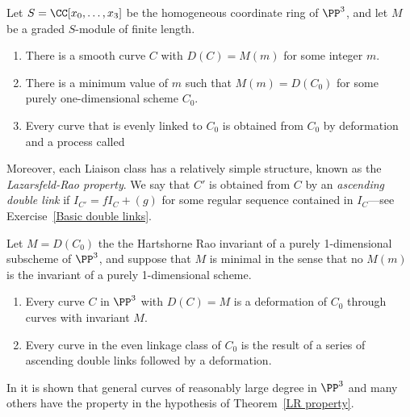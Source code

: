 \begin{fact}
\begin{theorem}
Let $S = \CC[x_0, \dots, x_3]$ be the homogeneous coordinate ring of $\PP^3$, and let $M$ be a graded $S$-module of finite length.
\begin{enumerate}
\item There is a smooth curve $C$ with $D(C) = M(m)$ for some integer $m$.
\item There is a minimum value of $m$ such that $M(m) = D(C_0)$ for some purely one-dimensional scheme $C_0$.
\item Every curve that is evenly linked to $C_0$ is obtained from $C_0$ by deformation and a process called
\end{enumerate}
\end{theorem}

Moreover, each Liaison class has a relatively simple structure, known as the \emph{Lazarsfeld-Rao property}.
We say that $C'$ is obtained from $C$ by an \emph{ascending double link} if $I_{C'} = fI_C+(g)$ for some regular sequence
contained in $I_C$---see Exercise~\ref{Basic double links}. 

\begin{theorem}\cite{MR1087803}\label{LR property}
Let $M = D(C_0)$ the the Hartshorne Rao invariant of a purely 1-dimensional subscheme of $\PP^3$, and suppose that
$M$ is minimal in the sense that no $M(m)$ is the invariant of a purely 1-dimensional scheme. 
\begin{enumerate}
 \item Every curve $C$ in $\PP^3$ with $D(C) = M$ is a deformation of $C_0$ through curves with invariant $M$.
 \item Every curve in the even linkage class of $C_0$ is the result of a series of ascending double links followed by a deformation.
\end{enumerate}
\end{theorem}

In \cite{MR714753} it is shown that general curves of reasonably large degree in $\PP^3$ and many others have the property in the hypothesis
of  Theorem~\ref{LR property}.
\end{fact}


